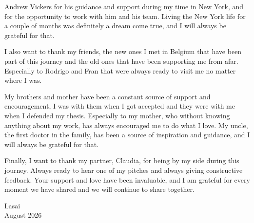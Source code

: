 Andrew Vickers for his guidance and support during my time in New York, and for the opportunity to work with him and his team. Living the New York life for a couple of months was definitely a dream come true, and I will always be grateful for that.

\vspace{1em}

 I also want to thank my friends, the new ones I met in Belgium that have been part of this journey and the old ones that have been supporting me from afar. Especially to Rodrigo and Fran that were always ready to visit me no matter where I was. 

My brothers and mother have been a constant source of support and encouragement, I was with them when I got accepted and they were with me when I defended my thesis. Especially to my mother, who without knowing anything about my work, has always encouraged me to do what I love. My uncle, the first doctor in the family, has been a source of inspiration and guidance, and I will always be grateful for that. 

Finally, I want to thank my partner, Claudia, for being by my side during this journey. Always ready to hear one of my pitches and always giving constructive feedback. Your support and love have been invaluable, and I am grateful for every moment we have shared and we will continue to share together.





{\raggedleft
Lasai \\
August 2026 \\
}
